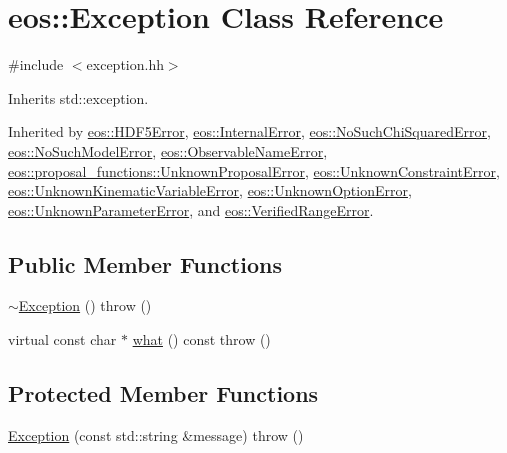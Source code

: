 \hypertarget{classeos_1_1Exception}{
\section{eos::Exception Class Reference}
\label{classeos_1_1Exception}
}


{\ttfamily \#include $<$exception.hh$>$}

Inherits std::exception.

Inherited by \hyperlink{classeos_1_1HDF5Error}{eos::HDF5Error}, \hyperlink{structeos_1_1InternalError}{eos::InternalError}, \hyperlink{structeos_1_1NoSuchChiSquaredError}{eos::NoSuchChiSquaredError}, \hyperlink{structeos_1_1NoSuchModelError}{eos::NoSuchModelError}, \hyperlink{structeos_1_1ObservableNameError}{eos::ObservableNameError}, \hyperlink{structeos_1_1proposal__functions_1_1UnknownProposalError}{eos::proposal\_\-functions::UnknownProposalError}, \hyperlink{structeos_1_1UnknownConstraintError}{eos::UnknownConstraintError}, \hyperlink{structeos_1_1UnknownKinematicVariableError}{eos::UnknownKinematicVariableError}, \hyperlink{structeos_1_1UnknownOptionError}{eos::UnknownOptionError}, \hyperlink{structeos_1_1UnknownParameterError}{eos::UnknownParameterError}, and \hyperlink{classeos_1_1VerifiedRangeError}{eos::VerifiedRangeError}.\subsection*{Public Member Functions}
\begin{DoxyCompactItemize}
\item 
\hyperlink{classeos_1_1Exception_a8cb6faea0484cc58c472da9e58c7c30a}{$\sim$Exception} ()  throw ()
\item 
virtual const char $\ast$ \hyperlink{classeos_1_1Exception_adce7a2af080165b09a599bb13438a8e1}{what} () const   throw ()
\end{DoxyCompactItemize}
\subsection*{Protected Member Functions}
\begin{DoxyCompactItemize}
\item 
\hyperlink{classeos_1_1Exception_acbc0fa64ca3d54cc1f828b07dc80e585}{Exception} (const std::string \&message)  throw ()
\end{DoxyCompactItemize}


